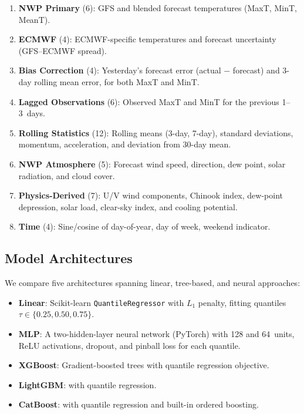 \documentclass{ametsocV6.1}
\begin{document}
\begin{enumerate}
  \item \textbf{NWP Primary} (6): GFS and blended forecast temperatures
    (MaxT, MinT, MeanT).
  \item \textbf{ECMWF} (4): ECMWF-specific temperatures and forecast uncertainty
    (GFS--ECMWF spread).
  \item \textbf{Bias Correction} (4): Yesterday's forecast error (actual $-$
    forecast) and 3-day rolling mean error, for both MaxT and MinT.
  \item \textbf{Lagged Observations} (6): Observed MaxT and MinT for the previous
    1--3~days.
  \item \textbf{Rolling Statistics} (12): Rolling means (3-day, 7-day), standard
    deviations, momentum, acceleration, and deviation from 30-day mean.
  \item \textbf{NWP Atmosphere} (5): Forecast wind speed, direction, dew point,
    solar radiation, and cloud cover.
  \item \textbf{Physics-Derived} (7): U/V wind components, Chinook index,
    dew-point depression, solar load, clear-sky index, and cooling potential.
  \item \textbf{Time} (4): Sine/cosine of day-of-year, day of week, weekend
    indicator.
\end{enumerate}

\subsection{Model Architectures}
\label{sec:models}

We compare five architectures spanning linear, tree-based, and neural approaches:

\begin{itemize}
  \item \textbf{Linear}: Scikit-learn \texttt{QuantileRegressor} with $L_1$
    penalty, fitting quantiles $\tau \in \{0.25, 0.50, 0.75\}$.
  \item \textbf{MLP}: A two-hidden-layer neural network (PyTorch) with 128 and
    64~units, ReLU activations, dropout, and pinball loss for each quantile.
  \item \textbf{XGBoost}: Gradient-boosted trees \citep{chen2016xgboost} with
    quantile regression objective.
  \item \textbf{LightGBM}: \citet{ke2017lightgbm} with quantile regression.
  \item \textbf{CatBoost}: \citet{prokhorenkova2018catboost} with quantile
    regression and built-in ordered boosting.
\end{itemize}
\end{document}
